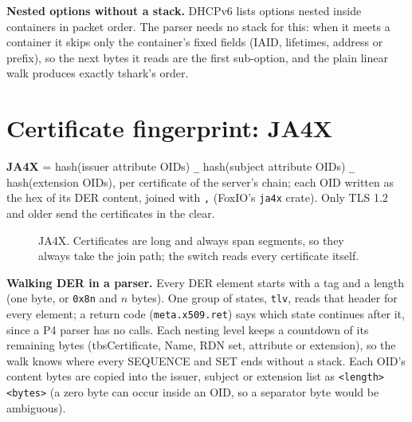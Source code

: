 \documentclass[11pt,a4paper]{article}
\newcommand{\code}[1]{\texttt{#1}}
\begin{document}
\textbf{Nested options without a stack.} DHCPv6 lists options nested inside containers in packet order. The parser
needs no stack for this: when it meets a container it skips only the container's fixed fields (IAID, lifetimes,
address or prefix), so the next bytes it reads are the first sub-option, and the plain linear walk produces exactly
tshark's order.

\section{Certificate fingerprint: JA4X}
\label{sec:x509}

\textbf{JA4X} = hash(issuer attribute OIDs) \code{\_} hash(subject attribute OIDs) \code{\_} hash(extension OIDs), per
certificate of the server's chain; each OID written as the hex of its DER content, joined with \code{,} (FoxIO's
\code{ja4x} crate). Only TLS 1.2 and older send the certificates in the clear.

\begin{figure}[H]\centering
{}
\caption{JA4X. Certificates are long and always span segments, so they always take the join path; the switch reads
every certificate itself.}
\end{figure}

\textbf{Walking DER in a parser.} Every DER element starts with a tag and a length (one byte, or \code{0x8n} and $n$
bytes). One group of states, \code{tlv}, reads that header for every element; a return code
(\code{meta.x509.ret}) says which state continues after it, since a P4 parser has no calls. Each nesting level keeps
a countdown of its remaining bytes (tbsCertificate, Name, RDN set, attribute or extension), so the walk knows where
every SEQUENCE and SET ends without a stack. Each OID's content bytes are copied into the issuer, subject or
extension list as \code{<length><bytes>} (a zero byte can occur inside an OID, so a separator byte would be ambiguous).
\end{document}
